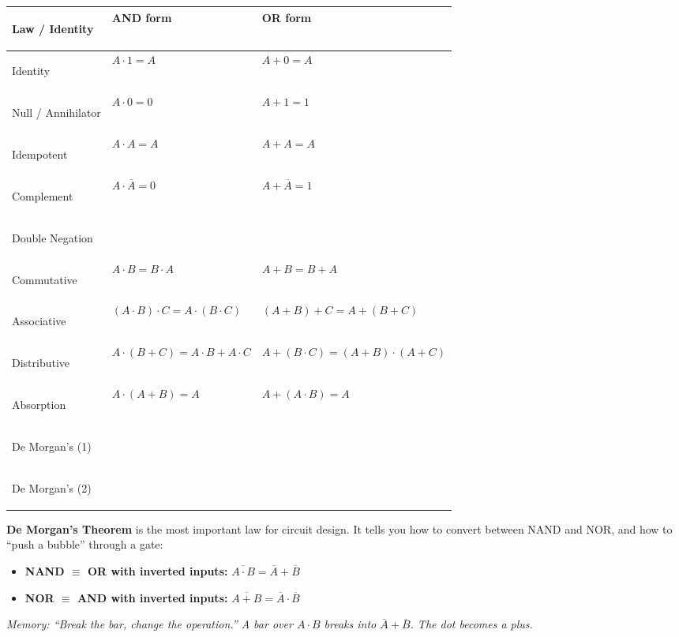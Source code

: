\documentclass[11pt, letterpaper]{article}
\begin{document}
\noindent
{\renewcommand{\arraystretch}{1.6}
\begin{tabularx}{\textwidth}{>{\bfseries\raggedright\arraybackslash}p{3.8cm}
                              >{\raggedright\arraybackslash}X
                              >{\raggedright\arraybackslash}X}
\toprule
\rowcolor{tableheaderorange}
\textbf{Law / Identity} & \textbf{AND form} & \textbf{OR form} \\
\midrule
\rowcolor{rowOr} Identity        & $A \cdot 1 = A$              & $A + 0 = A$ \\
\rowcolor{rowA}  Null / Annihilator & $A \cdot 0 = 0$           & $A + 1 = 1$ \\
\rowcolor{rowOr} Idempotent      & $A \cdot A = A$              & $A + A = A$ \\
\rowcolor{rowA}  Complement      & $A \cdot \overline{A} = 0$   & $A + \overline{A} = 1$ \\
\rowcolor{rowOr} Double Negation & \multicolumn{2}{l}{$\overline{\overline{A}} = A$} \\
\rowcolor{rowA}  Commutative     & $A \cdot B = B \cdot A$      & $A + B = B + A$ \\
\rowcolor{rowOr} Associative     & $(A \cdot B) \cdot C = A \cdot (B \cdot C)$ & $(A+B)+C = A+(B+C)$ \\
\rowcolor{rowA}  Distributive    & $A \cdot (B + C) = A\cdot B + A\cdot C$ & $A + (B \cdot C) = (A+B)\cdot(A+C)$ \\
\rowcolor{rowOr} Absorption      & $A \cdot (A + B) = A$        & $A + (A \cdot B) = A$ \\
\rowcolor{rowA}  De Morgan's (1) & \multicolumn{2}{l}{$\overline{A \cdot B} = \overline{A} + \overline{B}$} \\
\rowcolor{rowOr} De Morgan's (2) & \multicolumn{2}{l}{$\overline{A + B} = \overline{A} \cdot \overline{B}$} \\
\bottomrule
\end{tabularx}}

\begin{tcolorbox}[colback=notebg, colframe=noteborder, arc=3pt, boxrule=1pt]
\textbf{De Morgan's Theorem} is the most important law for circuit design. It tells you how to convert between NAND and NOR, and how to ``push a bubble'' through a gate:
\begin{itemize}[noitemsep, leftmargin=*]
  \item \textbf{NAND $\equiv$ OR with inverted inputs:} $\overline{A \cdot B} = \overline{A} + \overline{B}$
  \item \textbf{NOR $\equiv$ AND with inverted inputs:} $\overline{A + B} = \overline{A} \cdot \overline{B}$
\end{itemize}
\textit{Memory: ``Break the bar, change the operation.'' A bar over $A \cdot B$ breaks into $\bar{A} + \bar{B}$. The dot becomes a plus.}
\end{tcolorbox}
\end{document}
